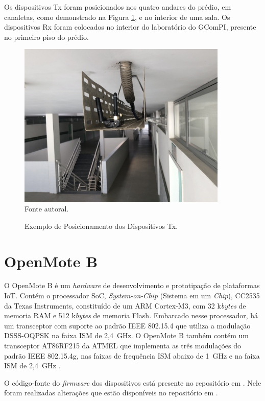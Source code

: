 Os dispositivos Tx foram posicionados nos quatro andares do prédio, em canaletas, como demonstrado na Figura \ref{fig:tx_canaleta}, e no interior de uma sala. Os dispositivos Rx foram colocados no interior do laboratório do GComPI, presente no primeiro piso do prédio.

\begin{figure}[h]
  \begin{center}
    \caption{Exemplo de Posicionamento dos Dispositivos Tx.}
    \includegraphics[width=10cm]{./sections/textual/chapters/images/tx_canaleta.jpg}\\
    Fonte autoral.
    \label{fig:tx_canaleta}
  \end{center}
\end{figure}

\section{OpenMote B}
O OpenMote B é um \emph{hardware} de desenvolvimento e prototipação de plataformas IoT. Contém o processador SoC, \emph{System-on-Chip} (Sistema em um \emph{Chip}), CC2535 da Texas Instruments, constituído de um ARM Cortex-M3, com 32 k\emph{bytes} de memoria RAM e 512 k\emph{bytes} de memoria Flash. Embarcado nesse processador, há um transceptor com suporte ao padrão IEEE 802.15.4 que utiliza a modulação DSSS-OQPSK na faixa ISM de 2,4~GHz. O OpenMote B também contém um transceptor AT86RF215 da ATMEL que implementa as três modulações do padrão IEEE 802.15.4g, nas faixas de frequência ISM abaixo de 1~GHz e na faixa ISM de 2,4~GHz \cite{openmoteb-userguide}.

O código-fonte do \emph{firmware} dos dispositivos está presente no repositório em \cite{openmoteb-firmware}. Nele foram realizadas alterações que estão disponíveis no repositório em \cite{openmoteb-gcompi}.

